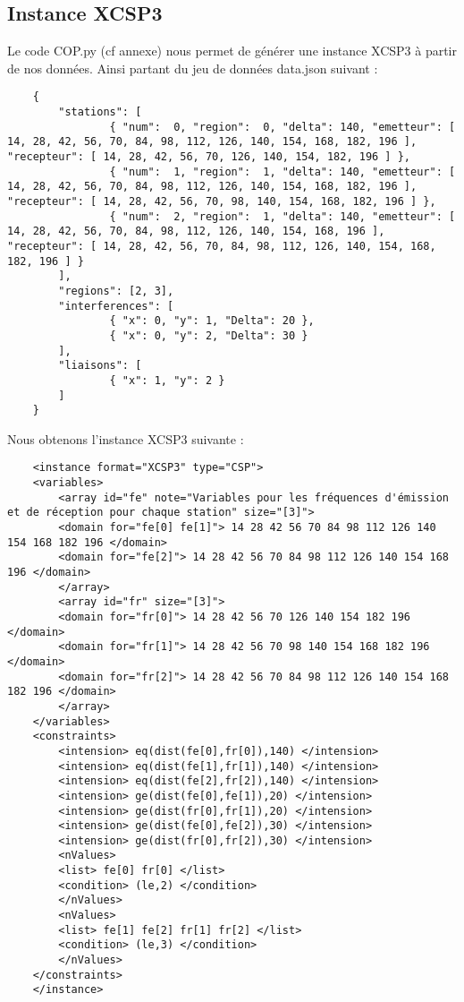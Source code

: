 \documentclass[12pt]{article}
\begin{document}
\subsection{Instance XCSP3}
Le code COP.py (cf annexe) nous permet de générer une instance XCSP3 à partir de nos données. Ainsi partant du jeu de données data.json suivant : 
\begin{verbatim}
    {
        "stations": [
                { "num":  0, "region":  0, "delta": 140, "emetteur": [ 14, 28, 42, 56, 70, 84, 98, 112, 126, 140, 154, 168, 182, 196 ], "recepteur": [ 14, 28, 42, 56, 70, 126, 140, 154, 182, 196 ] },
                { "num":  1, "region":  1, "delta": 140, "emetteur": [ 14, 28, 42, 56, 70, 84, 98, 112, 126, 140, 154, 168, 182, 196 ], "recepteur": [ 14, 28, 42, 56, 70, 98, 140, 154, 168, 182, 196 ] },
                { "num":  2, "region":  1, "delta": 140, "emetteur": [ 14, 28, 42, 56, 70, 84, 98, 112, 126, 140, 154, 168, 196 ], "recepteur": [ 14, 28, 42, 56, 70, 84, 98, 112, 126, 140, 154, 168, 182, 196 ] }
        ],
        "regions": [2, 3],
        "interferences": [
                { "x": 0, "y": 1, "Delta": 20 },
                { "x": 0, "y": 2, "Delta": 30 }
        ],
        "liaisons": [
                { "x": 1, "y": 2 }
        ]
    }
\end{verbatim}

Nous obtenons l'instance XCSP3 suivante : 
\begin{verbatim}
    <instance format="XCSP3" type="CSP">
    <variables>
        <array id="fe" note="Variables pour les fréquences d'émission et de réception pour chaque station" size="[3]">
        <domain for="fe[0] fe[1]"> 14 28 42 56 70 84 98 112 126 140 154 168 182 196 </domain>
        <domain for="fe[2]"> 14 28 42 56 70 84 98 112 126 140 154 168 196 </domain>
        </array>
        <array id="fr" size="[3]">
        <domain for="fr[0]"> 14 28 42 56 70 126 140 154 182 196 </domain>
        <domain for="fr[1]"> 14 28 42 56 70 98 140 154 168 182 196 </domain>
        <domain for="fr[2]"> 14 28 42 56 70 84 98 112 126 140 154 168 182 196 </domain>
        </array>
    </variables>
    <constraints>
        <intension> eq(dist(fe[0],fr[0]),140) </intension>
        <intension> eq(dist(fe[1],fr[1]),140) </intension>
        <intension> eq(dist(fe[2],fr[2]),140) </intension>
        <intension> ge(dist(fe[0],fe[1]),20) </intension>
        <intension> ge(dist(fr[0],fr[1]),20) </intension>
        <intension> ge(dist(fe[0],fe[2]),30) </intension>
        <intension> ge(dist(fr[0],fr[2]),30) </intension>
        <nValues>
        <list> fe[0] fr[0] </list>
        <condition> (le,2) </condition>
        </nValues>
        <nValues>
        <list> fe[1] fe[2] fr[1] fr[2] </list>
        <condition> (le,3) </condition>
        </nValues>
    </constraints>
    </instance>
\end{verbatim}
\end{document}
